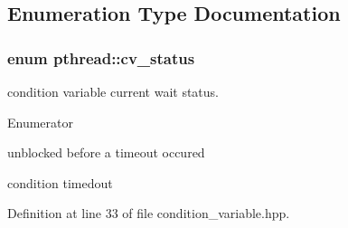 \subsection{Enumeration Type Documentation}
\hypertarget{group__concurrency_ga823f88a2bf448bd5bd5273b826830bdd}{
\subsubsection[{cv\+\_\+status}]{\setlength{\rightskip}{0pt plus 5cm}enum {\bf pthread\+::cv\+\_\+status}}}\label{group__concurrency_ga823f88a2bf448bd5bd5273b826830bdd}
condition variable current wait status. \begin{Desc}
\item[Enumerator]\par
\begin{description}
\item[{\em 
\hypertarget{group__concurrency_gga823f88a2bf448bd5bd5273b826830bdda633b1bc5140f77a22f2c26bea4fa3398}{no\+\_\+timeout}\label{group__concurrency_gga823f88a2bf448bd5bd5273b826830bdda633b1bc5140f77a22f2c26bea4fa3398}
}]unblocked before a timeout occured \item[{\em 
\hypertarget{group__concurrency_gga823f88a2bf448bd5bd5273b826830bdda1c2d3e88a4ad820053c817753867b31a}{timedout}\label{group__concurrency_gga823f88a2bf448bd5bd5273b826830bdda1c2d3e88a4ad820053c817753867b31a}
}]condition timedout \end{description}
\end{Desc}


Definition at line 33 of file condition\+\_\+variable.\+hpp.

